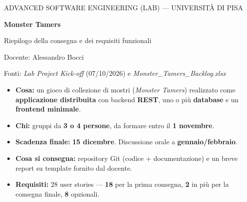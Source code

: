 \documentclass[11pt,a4paper]{article}
\begin{document}
\thispagestyle{empty}
\begin{tcolorbox}[enhanced,colback=accent,colframe=accent,arc=4pt,
  left=14pt,right=14pt,top=16pt,bottom=16pt]
  \color{white}
  {\small ADVANCED SOFTWARE ENGINEERING (LAB) --- UNIVERSITÀ DI PISA}\par\medskip
  {\fontsize{30}{34}\selectfont\bfseries Monster Tamers}\par\smallskip
  {\Large Riepilogo della consegna e dei requisiti funzionali}\par\medskip
  {\raggedright\small Docente: Alessandro Bocci\par
  Fonti: \emph{Lab Project Kick-off} (07/10/2026) e \emph{Monster\_Tamers\_Backlog.xlsx}\par}
\end{tcolorbox}

\vspace{4mm}

\begin{infobox}[title={In breve}]
\begin{itemize}[leftmargin=1.2em]
  \item \textbf{Cosa:} un gioco di collezione di mostri (\emph{Monster Tamers}) realizzato come
        \textbf{applicazione distribuita} con backend \textbf{REST}, uno o più \textbf{database}
        e un \textbf{frontend minimale}.
  \item \textbf{Chi:} gruppi da \textbf{3 o 4 persone}, da formare entro il \textbf{1 novembre}.
  \item \textbf{Scadenza finale:} \textbf{15 dicembre}. Discussione orale a \textbf{gennaio/febbraio}.
  \item \textbf{Cosa si consegna:} repository Git (codice + documentazione) e un breve report
        su template fornito dal docente.
  \item \textbf{Requisiti:} 28 user stories --- \textbf{18} per la prima consegna, \textbf{2} in più
        per la consegna finale, \textbf{8} opzionali.
\end{itemize}
\end{infobox}

\vspace{2mm}
\setcounter{tocdepth}{1}
{\small\tableofcontents}

\newpage

\end{document}
